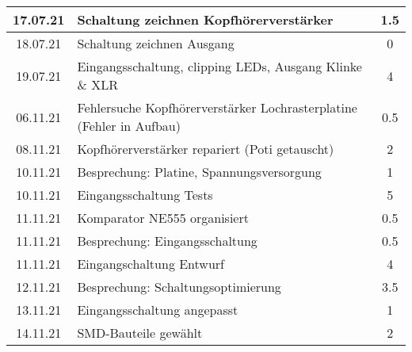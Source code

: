 \begin{longtable}{c|p{10cm}|c}
    17.07.21       & Schaltung zeichnen Kopfhörerverstärker                                                                 & 1.5                   \\ \hline
    18.07.21       & Schaltung zeichnen Ausgang                                                                             & 0                     \\ \hline
    19.07.21       & Eingangsschaltung, clipping LEDs, \newline Ausgang Klinke \& XLR                                                & 4                     \\ \hline
    06.11.21       & Fehlersuche Kopfhörerverstärker \newline Lochrasterplatine (Fehler in   Aufbau)                                 & 0.5                   \\ \hline
    08.11.21       & Kopfhörerverstärker repariert (Poti getauscht)                                                         & 2                     \\ \hline
    10.11.21       & Besprechung: Platine, Spannungsversorgung                                                              & 1                     \\ \hline
    10.11.21       & Eingangsschaltung Tests                                                                                & 5                     \\ \hline
    11.11.21       & Komparator NE555 organisiert                                                                           & 0.5                   \\ \hline
    11.11.21       & Besprechung: Eingangsschaltung                                                                         & 0.5                   \\ \hline
    11.11.21       & Eingangschaltung Entwurf                                                                               & 4                     \\ \hline
    12.11.21       & Besprechung: Schaltungsoptimierung                                                                     & 3.5                   \\ \hline
    13.11.21       & Eingangsschaltung angepasst                                                                            & 1                     \\ \hline
    14.11.21       & SMD-Bauteile gewählt                                                                                   & 2                     \\ \hline

\end{longtable}
